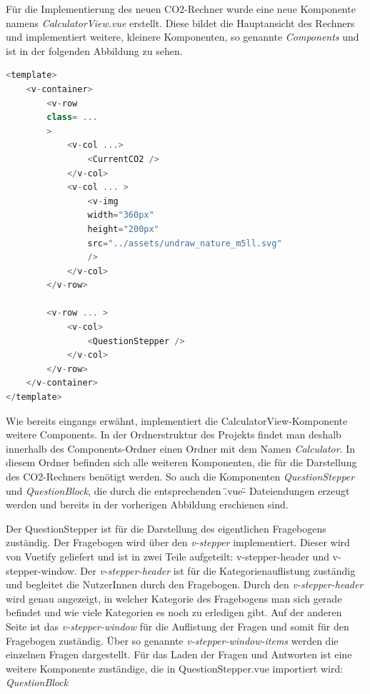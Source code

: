 Für die Implementierung des neuen CO2-Rechner wurde eine neue Komponente namens \textit{CalculatorView.vue} erstellt. Diese bildet die Hauptansicht des Rechners und implementiert weitere, kleinere Komponenten, so genannte \textit{Components} und ist in der folgenden Abbildung zu sehen.

\begin{lstlisting}[language={JavaScript}, caption={Aufbau der CalculatorView.vue Komponente}]
<template>
    <v-container>
        <v-row
        class= ...
        >
            <v-col ...>
                <CurrentCO2 />
            </v-col>
            <v-col ... >
                <v-img
                width="360px"
                height="200px"
                src="../assets/undraw_nature_m5ll.svg"
                />
            </v-col>
        </v-row>

        <v-row ... >
            <v-col>
                <QuestionStepper />
            </v-col>
        </v-row>
    </v-container>
</template>
\end{lstlisting}

Wie bereits eingangs erwähnt, implementiert die CalculatorView-Komponente weitere Components. In der Ordnerstruktur des Projekts findet man deshalb innerhalb des Components-Ordner einen Ordner mit dem Namen \textit{Calculator}. In diesem Ordner befinden sich alle weiteren Komponenten, die für die Darstellung des CO2-Rechners benötigt werden. So auch die Komponenten \textit{QuestionStepper} und \textit{QuestionBlock}, die durch die entsprechenden \".vue\"- Dateiendungen erzeugt werden und bereits in der vorherigen Abbildung erschienen sind.

Der QuestionStepper ist für die Darstellung des eigentlichen Fragebogens zuständig. Der Fragebogen wird über den \textit{v-stepper} implementiert. Dieser wird von Vuetify geliefert und ist in zwei Teile aufgeteilt: v-stepper-header und v-stepper-window. Der \textit{v-stepper-header} ist für die Kategorienauflistung zuständig und begleitet die NutzerInnen durch den Fragebogen. Durch den \textit{v-stepper-header} wird genau angezeigt, in welcher Kategorie des Fragebogens man sich gerade befindet und wie viele Kategorien es noch zu erledigen gibt. Auf der anderen Seite ist das \textit{v-stepper-window} für die Auflistung der Fragen und somit für den Fragebogen zuständig. Über so genannte \textit{v-stepper-window-items} werden die einzelnen Fragen dargestellt. Für das Laden der Fragen und Antworten ist eine weitere Komponente zuständige, die in QuestionStepper.vue importiert wird: \textit{QuestionBlock}

